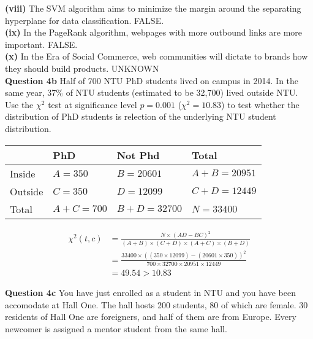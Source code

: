 \documentclass[11pt,a4paper]{report}
\begin{document}
\begin{multicols*}{2}
\noindent \textbf{(viii)} The SVM algorithm aims to minimize the margin around the separating hyperplane for data classification. FALSE.\\

\noindent \textbf{(ix)} In the PageRank algorithm, webpages with more outbound links are more important. FALSE.\\

\noindent \textbf{(x)} In the Era of Social Commerce, web communities will dictate to brands how they should build products. UNKNOWN\\

\noindent \textbf{Question 4b} Half of 700 NTU PhD students lived on campus in 2014. In the same year, 37\% of NTU students (estimated to be 32,700) lived outside NTU. Use the $\chi^2$ test at significance level $p=0.001$ ($\chi^2=10.83$) to test whether the distribution of PhD students is relection of the underlying NTU student distribution.

\scriptsize
\begin{center}
\begin{tabular}{ |l|l|l|l| } 
    \hline
            & PhD       & Not Phd     & Total \\
    \hline 
    Inside  & $A = 350$ & $B = 20601$ & $A+B=20951$ \\
    Outside & $C = 350$ & $D = 12099$ & $C+D=12449$ \\
    Total   & $A+C=700$ & $B+D=32700$ & $N=33400$ \\
    \hline
\end{tabular}
\end{center}
\normalsize

\begin{equation*}
\begin{split}
   \chi^2(t,c) &= \frac{N\times (AD - BC)^2}{(A+B) \times (C+D) \times (A+C) \times (B+D)} \\
   &= \frac{33400\times ((350 \times 12099) - (20601 \times 350))^2}{700\times 32700 \times 20951 \times 12449}\\
   &= 49.54 > 10.83
\end{split}
\end{equation*}

\noindent \textbf{Question 4c} You have just enrolled as a student in NTU and you have been accomodate at Hall One. The hall hosts 200 students, 80 of which are female. 30 residents of Hall One are foreigners, and half of them are from Europe. Every newcomer is assigned a mentor student from the same hall.\\


\end{multicols*}
\end{document}
